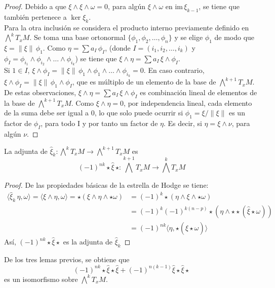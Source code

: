 \begin{proof}
Debido a que $\xi \wedge \xi \wedge \omega = 0$,   para algún $\xi \wedge \omega$ en $\text{im}\, \xi_{k-1}$, se tiene que también pertenece a $\ker \xi_{k}$.\\
Para la otra inclusión se considera el producto interno previamente definido en $\bigwedge^{k}T_xM$. Se toma una base ortonormal $\{\phi_1,\phi_2, \ldots,\phi_n\}$ y se elige $\phi_1$ de modo que $\xi = \|\xi\|\,\phi_1$. Como $\eta = \sum{a_I\, \phi_I}$, (donde $I = (i_1, i_2,\ldots,i_k)$ y $\phi_I = \phi_{i_1}\wedge\phi_{i_2}\wedge\ldots\wedge \phi_{i_k}$) se tiene que $\xi \wedge \eta = \sum{a_I\,\xi \wedge \phi_I}$.\\
Si $1 \in I$, $\xi \wedge \phi_I = \|\xi\|\,\phi_1 \wedge \phi_1 \wedge \ldots \wedge \phi_{i_k} = 0$. En caso contrario, $\xi \wedge \phi_I = \|\xi\|\,\phi_1\wedge\phi_I$, que es múltiplo de un elemento de la base de $\bigwedge^{k+1}T_xM$. De estas observaciones, $\xi \wedge \eta = \sum{a_I\,\xi \wedge \phi_I}$ es combinación lineal de elementos de la base de $\bigwedge^{k+1}T_xM$. Como $\xi \wedge \eta = 0$, por independencia lineal, cada elemento de la suma debe ser igual a 0, lo que solo puede ocurrir si $\phi_1 = \xi / \|\xi\|$ es un factor de $\phi_I$, para todo I y por tanto un factor de $\eta$. Es decir, si $\eta = \xi \wedge \nu $, para algún $\nu$.   
\end{proof}

\begin{lem}
La adjunta de $\hat\xi_k\colon\bigwedge^{k}T_xM\to\bigwedge^{k+1}T_xM$ es
\[(-1)^{nk}\star\hat\xi\,\star\colon \bigwedge^{k+1}T_xM \to \bigwedge^{k}T_xM\]
\end{lem}

\begin{proof}
De las propiedades básicas de la estrella de Hodge se tiene:
\begin{align*}
    \langle \hat \xi_k\,\eta, \omega \rangle = \langle \xi \wedge \eta, \omega\rangle = \star(\xi \wedge \eta \wedge\star\omega) &= (-1)^k\star(\eta \wedge \xi\wedge\star\omega)\\ &= (-1)^k(-1)^{k(n-p)}\star(\eta \wedge  \star\star(\hat\xi\star\omega)) \\
    &= (-1)^{nk}\langle\eta, \star(\hat\xi\star\omega)\rangle
\end{align*}
Así, $(-1)^{nk}\star\hat\xi\star$ es la adjunta de $\hat\xi_k$
\end{proof}


De los tres lemas previos, se obtiene que
\begin{equation}
\label{isomorfismo}
    (-1)^{nk}\star\hat\xi\star\hat\xi + (-1)^{n(k-1)}\hat\xi\star\hat\xi\star
\end{equation}
es un isomorfismo sobre $\bigwedge^{k}T_xM$.
\\

